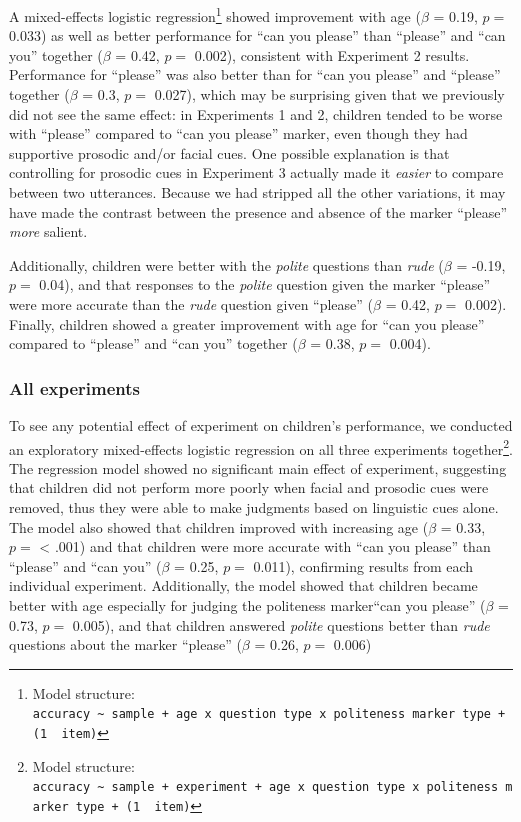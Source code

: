 \documentclass[10pt, letterpaper]{article}
\begin{document}
A mixed-effects logistic regression\footnote{Model structure:
  \texttt{accuracy\ \textasciitilde{}\ sample\ +\ age\ x\ question\ type\ x\ politeness\ marker\ type\ +\ (1\ \textbar{}\ item)}}
showed improvement with age (\(\beta\) = 0.19, \(p =\) 0.033) as well as
better performance for ``can you please'' than ``please'' and ``can
you'' together (\(\beta\) = 0.42, \(p =\) 0.002), consistent with
Experiment 2 results. Performance for ``please'' was also better than
for ``can you please'' and ``please'' together (\(\beta\) = 0.3, \(p =\)
0.027), which may be surprising given that we previously did not see the
same effect: in Experiments 1 and 2, children tended to be worse with
``please'' compared to ``can you please'' marker, even though they had
supportive prosodic and/or facial cues. One possible explanation is that
controlling for prosodic cues in Experiment 3 actually made it
\emph{easier} to compare between two utterances. Because we had stripped
all the other variations, it may have made the contrast between the
presence and absence of the marker ``please'' \emph{more} salient.

Additionally, children were better with the \emph{polite} questions than
\emph{rude} (\(\beta\) = -0.19, \(p =\) 0.04), and that responses to the
\emph{polite} question given the marker ``please'' were more accurate
than the \emph{rude} question given ``please'' (\(\beta\) = 0.42,
\(p =\) 0.002). Finally, children showed a greater improvement with age
for ``can you please'' compared to ``please'' and ``can you'' together
(\(\beta\) = 0.38, \(p =\) 0.004).

\subsubsection{All experiments}\label{all-experiments}

To see any potential effect of experiment on children's performance, we
conducted an exploratory mixed-effects logistic regression on all three
experiments together\footnote{Model structure:
  \texttt{accuracy\ \textasciitilde{}\ sample\ +\ experiment\ +\ age\ x\ question\ type\ x\ politeness\ marker\ type\ +\ (1\ \textbar{}\ item)}}.
The regression model showed no significant main effect of experiment,
suggesting that children did not perform more poorly when facial and
prosodic cues were removed, thus they were able to make judgments based
on linguistic cues alone. The model also showed that children improved
with increasing age (\(\beta\) = 0.33, \(p =\) \textless{} .001) and
that children were more accurate with ``can you please'' than ``please''
and ``can you'' (\(\beta\) = 0.25, \(p =\) 0.011), confirming results
from each individual experiment. Additionally, the model showed that
children became better with age especially for judging the politeness
marker``can you please'' (\(\beta\) = 0.73, \(p =\) 0.005), and that
children answered \emph{polite} questions better than \emph{rude}
questions about the marker ``please'' (\(\beta\) = 0.26, \(p =\) 0.006)
\end{document}
